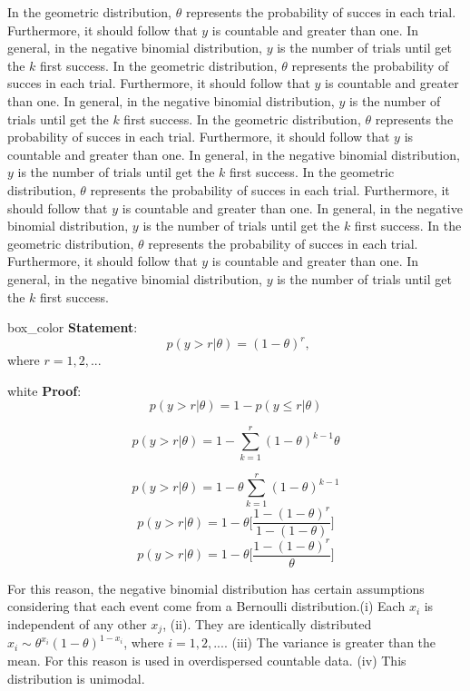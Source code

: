 \documentclass[11pt, a4paper, top=3.5cm,bottom=3.5cm, right=3cm,left=3cm]{SimpleNotes}
\begin{document}
In the geometric distribution, $\theta$ represents the probability of succes in each trial. Furthermore, it should follow that $y$ is countable and greater than one. In general, in the negative binomial distribution, $y$ is the number of trials until get the $k$ first success.
In the geometric distribution, $\theta$ represents the probability of succes in each trial. Furthermore, it should follow that $y$ is countable and greater than one. In general, in the negative binomial distribution, $y$ is the number of trials until get the $k$ first success.
In the geometric distribution, $\theta$ represents the probability of succes in each trial. Furthermore, it should follow that $y$ is countable and greater than one. In general, in the negative binomial distribution, $y$ is the number of trials until get the $k$ first success.
In the geometric distribution, $\theta$ represents the probability of succes in each trial. Furthermore, it should follow that $y$ is countable and greater than one. In general, in the negative binomial distribution, $y$ is the number of trials until get the $k$ first success.
In the geometric distribution, $\theta$ represents the probability of succes in each trial. Furthermore, it should follow that $y$ is countable and greater than one. In general, in the negative binomial distribution, $y$ is the number of trials until get the $k$ first success.

\begin{sframe}{box_color}
  \textbf{Statement}:\\
\begin{equation}
  \label{eq:bla}
~~p(y>r|\theta)=(1-\theta)^r,
\end{equation}
where $r = 1,2,...$
\end{sframe}

\begin{sframe}{white}
\textbf{Proof}:
\[p(y>r|\theta)=1-p(y\leq r|\theta)\]

\[p(y>r|\theta)=1-\sum\limits_{k=1}^{r}(1-\theta)^{k-1}\theta\]

\[p(y>r|\theta)=1-\theta\sum\limits_{k=1}^{r}(1-\theta)^{k-1}\]
\[p(y>r|\theta)=1-\theta\bigg[\frac{1-(1-\theta)^r}{1-(1-\theta)}\bigg]\]
\[p(y>r|\theta)=1-\theta\bigg[\frac{1-(1-\theta)^r}{\theta}\bigg]\]
\end{sframe}

For this reason, the negative binomial distribution has certain assumptions considering that each event come from a Bernoulli distribution.(i) Each $x_i$ is independent of any other $x_j$, (ii). They are identically distributed $x_i\sim\theta^{x_i}(1-\theta)^{1-x_i}$, where $i =1,2,...$. (iii) The variance is greater than the mean. For this reason is used in overdispersed countable data. (iv) This distribution is unimodal.
\end{document}
